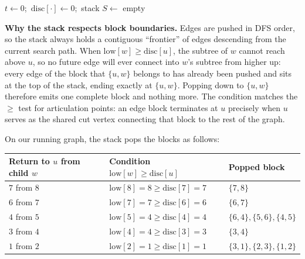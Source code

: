 \begin{algorithm}[H]
\caption{\textsc{BiconnectedComponents}: peel blocks with an edge stack}
\label{ch10:alg-bcc}
$t\gets0$;\ $\mathrm{disc}[\cdot]\gets0$;\ stack $S\gets$ empty\;
\end{algorithm}

\begin{whybox}
\textbf{Why the stack respects block boundaries.} Edges are pushed in DFS order, so the
stack always holds a contiguous ``frontier'' of edges descending from the current
search path. When $\mathrm{low}[w]\ge\mathrm{disc}[u]$, the subtree of $w$ cannot reach
above $u$, so no future edge will ever connect into $w$'s subtree from higher up: every
edge of the block that $\{u,w\}$ belongs to has already been pushed and sits at the top
of the stack, ending exactly at $\{u,w\}$. Popping down to $\{u,w\}$ therefore emits one
complete block and nothing more. The condition matches the $\ge$ test for articulation points: an edge block terminates
at $u$ precisely when $u$ serves as the shared cut vertex connecting that block to the
rest of the graph.
\end{whybox}

On our running graph, the stack pops the blocks as follows:

\begin{center}
\begin{tabular}{lll}
\toprule
\textbf{Return to $u$ from child $w$} & \textbf{Condition} $\mathrm{low}[w] \ge \mathrm{disc}[u]$ & \textbf{Popped block} \\
\midrule
$7$ from $8$ & $\mathrm{low}[8]=8 \ge \mathrm{disc}[7]=7$ & $\{7,8\}$ \\
$6$ from $7$ & $\mathrm{low}[7]=7 \ge \mathrm{disc}[6]=6$ & $\{6,7\}$ \\
$4$ from $5$ & $\mathrm{low}[5]=4 \ge \mathrm{disc}[4]=4$ & $\{6,4\}, \{5,6\}, \{4,5\}$ \\
$3$ from $4$ & $\mathrm{low}[4]=4 \ge \mathrm{disc}[3]=3$ & $\{3,4\}$ \\
$1$ from $2$ & $\mathrm{low}[2]=1 \ge \mathrm{disc}[1]=1$ & $\{3,1\}, \{2,3\}, \{1,2\}$ \\
\bottomrule
\end{tabular}
\end{center}

